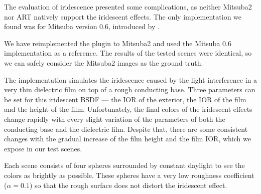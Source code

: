 The evaluation of iridescence presented some complications, as neither Mitsuba2 nor ART natively support the iridescent effects. The only implementation we found was for Mitsuba version 0.6, introduced by \citet{belcour2017practical}.

We have reimplemented the plugin to Mitsuba2 and used the Mitsuba 0.6 implementation as a reference. The results of the tested scenes were identical, so we can safely consider the Mitsuba2 images as the ground truth.

The implementation simulates the iridescence caused by the light interference in a very thin dielectric film on top of a rough conducting base. Three parameters can be set for this iridescent BSDF --- the IOR of the exterior, the IOR of the film and the height of the film. Unfortunately, the final colors of the iridescent effects change rapidly with every slight variation of the parameters of both the conducting base and the dielectric film. Despite that, there are some consistent changes with the gradual increase of the film height and the film IOR, which we expose in our test scenes. 

Each scene consists of four spheres surrounded by constant daylight to see the colors as brightly as possible. These spheres have a very low roughness coefficient ($\alpha=0.1$) so that the rough surface does not distort the iridescent effect.

